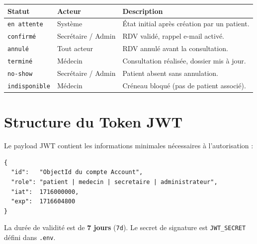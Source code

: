\documentclass[12pt,a4paper]{report}
\begin{document}
\begin{center}
\small
\begin{tabular}{@{} l l p{7cm} @{}}
  \toprule
  \textbf{Statut} & \textbf{Acteur} & \textbf{Description} \\
  \midrule
  \texttt{en attente}  & Système              & État initial après création par un patient. \\
  \texttt{confirmé}    & Secrétaire / Admin   & RDV validé, rappel e-mail activé. \\
  \texttt{annulé}      & Tout acteur          & RDV annulé avant la consultation. \\
  \texttt{terminé}     & Médecin              & Consultation réalisée, dossier mis à jour. \\
  \texttt{no-show}     & Secrétaire / Admin   & Patient absent sans annulation. \\
  \texttt{indisponible}& Médecin              & Créneau bloqué (pas de patient associé). \\
  \bottomrule
\end{tabular}
\end{center}

\chapter{Structure du Token JWT}

Le payload JWT contient les informations minimales nécessaires à l'autorisation :

\begin{lstlisting}
{
  "id":   "ObjectId du compte Account",
  "role": "patient | medecin | secretaire | administrateur",
  "iat":  1716000000,
  "exp":  1716604800
}
\end{lstlisting}

La durée de validité est de \textbf{7 jours} (\texttt{7d}). Le secret de signature est \texttt{JWT\_SECRET} défini dans \texttt{.env}.
\end{document}
